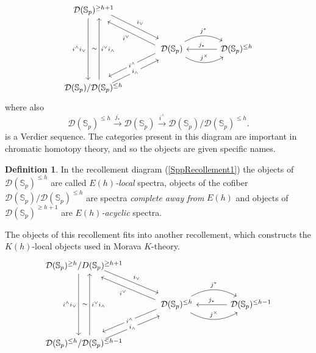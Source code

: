 \documentclass[a4paper]{article} %
\theoremstyle{definition}
\newtheorem{definition}[theorem]{Definition}
\newcommand{\toWithMapLong}[1]{\overset{#1}{\longrightarrow}}
\newcommand{\Spp}{\mathcal{D}(\mathbb{S}_p)}
\begin{document}
\begin{equation}
  \label{SppRecollement1}
  \begin{tikzcd}[sep = large]
  \Spp^{\ge h+1} \arrow[dr, shift left=1ex, "i_\vee"] \arrow[dd, shift right=1.5ex, "i^\wedge i_\vee"'] \\
  {} & \Spp  \arrow[dl,shift  right=1ex, "i^\wedge" description]  \arrow[ul, shift left=1ex, "i^\vee"]  \arrow[r, bend left, "j^*"] \arrow[r, above, bend right, "j^\times"] & \arrow{l}{}[swap]{j_*} \Spp^{\le h} \\
  \Spp/ \Spp^{\le h} \arrow[ur, shift right=1ex, "i_\wedge" description] \arrow[uu, shift right=1.5ex, "\sim", "i^\vee i_\wedge"']
  \end{tikzcd}
\end{equation}
where also
\[
\Spp^{\le h} \toWithMapLong{j_*} \Spp \toWithMapLong{i^\wedge} \Spp / \Spp^{\le h}.
\]
is a Verdier sequence. The categories present in this diagram are important in chromatic homotopy theory, and so the objects are given specific names.
\begin{definition}
In the recollement diagram (\ref{SppRecollement1}) the objects of $\Spp^{\le h}$ are called $E(h)$\textit{-local} spectra, objects of the cofiber $\Spp/\Spp^{\le h}$ are spectra \textit{complete away from} $E(h)$ and objects of $\Spp^{\ge h+1}$ are $E(h)$\textit{-acyclic} spectra.
\end{definition}
The objects of this recollement fits into another recollement, which constructs the $K(h)$-local objects used in Morava $K$-theory.
\begin{equation}
  \label{SppRecollement2}
    \begin{tikzcd}[sep = large]
    \Spp^{\ge h}/D(\mathbb{S}_p)^{\ge h+1} \arrow[dr, shift left=1ex, "i_\vee"] \arrow[dd, shift right=1.5ex, "i^\wedge i_\vee"'] \\
    {} & \Spp^{\le h}  \arrow[dl,shift  right=1ex, "i^\wedge" description]  \arrow[ul, shift left=1ex, "i^\vee"]  \arrow[r, bend left, "j^*"] \arrow[r, above, bend right, "j^\times"] & \arrow{l}{}[swap]{j_*} \Spp^{\le h-1} \\
    \Spp^{\le h}/\Spp^{\le h-1} \arrow[ur, shift right=1ex, "i_\wedge" description] \arrow[uu, shift right=1.5ex, "\sim", "i^\vee i_\wedge"']
    \end{tikzcd}
\end{equation}
\end{document}
